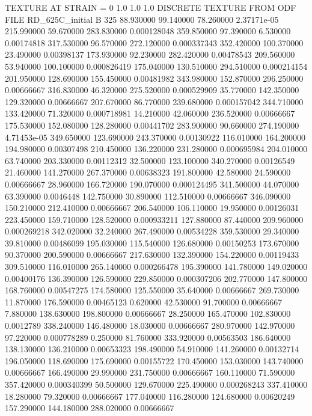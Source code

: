 TEXTURE AT STRAIN = 0
1.0   1.0   1.0
DISCRETE TEXTURE FROM ODF FILE RD_625C_initial
B 325
88.930000	99.140000	78.260000	2.37171e-05
215.990000	59.670000	283.830000	0.000128048
359.850000	97.390000	6.530000	0.00174818
317.530000	96.570000	272.120000	0.000337343
352.420000	100.370000	23.490000	0.00398137
173.930000	92.230000	282.420000	0.00478543
209.560000	53.940000	100.100000	0.000826419
175.040000	130.510000	294.510000	0.000214154
201.950000	128.690000	155.450000	0.00481982
343.980000	152.870000	296.250000	0.00666667
316.830000	46.320000	275.520000	0.000529909
35.770000	142.350000	129.320000	0.00666667
207.670000	86.770000	239.680000	0.000157042
344.710000	133.420000	71.320000	0.000718981
14.210000	42.060000	236.520000	0.00666667
175.530000	152.080000	128.280000	0.00441702
283.900000	90.660000	274.190000	4.71453e-05
349.650000	123.690000	243.370000	0.00130922
116.010000	164.200000	194.980000	0.00307498
210.450000	136.220000	231.280000	0.000695984
204.010000	63.740000	203.330000	0.00112312
32.500000	123.100000	340.270000	0.00126549
21.460000	141.270000	267.370000	0.00638323
191.800000	42.580000	24.590000	0.00666667
28.960000	166.720000	190.070000	0.000124495
341.500000	44.070000	63.390000	0.0046448
142.750000	30.890000	112.510000	0.00666667
346.090000	150.210000	212.410000	0.00666667
206.540000	106.110000	19.950000	0.00126031
223.450000	159.710000	128.520000	0.000933211
127.880000	87.440000	209.960000	0.000269218
342.020000	32.240000	267.490000	0.00534228
359.530000	29.340000	39.810000	0.00486099
195.030000	115.540000	126.680000	0.00150253
173.670000	90.370000	200.590000	0.00666667
217.630000	132.390000	154.220000	0.00119433
309.510000	116.010000	265.140000	0.000266478
195.390000	141.780000	149.020000	0.00400176
136.390000	126.590000	229.850000	0.000307206
202.770000	147.800000	168.760000	0.00547275
174.580000	125.550000	35.640000	0.00666667
269.730000	11.870000	176.590000	0.00465123
0.620000	42.530000	91.700000	0.00666667
7.880000	138.630000	198.800000	0.00666667
28.250000	165.470000	102.830000	0.0012789
338.240000	146.480000	18.030000	0.00666667
280.970000	142.970000	97.220000	0.000778289
0.250000	81.760000	333.920000	0.00563503
186.640000	138.130000	136.210000	0.00653323
198.490000	54.910000	141.260000	0.00132714
196.050000	118.690000	175.690000	0.00155722
170.450000	153.030000	143.740000	0.00666667
166.490000	29.990000	231.750000	0.00666667
160.110000	71.590000	357.420000	0.000340399
50.500000	129.670000	225.490000	0.000268243
337.410000	18.280000	79.320000	0.00666667
177.040000	116.280000	124.680000	0.00620249
157.290000	144.180000	288.020000	0.00666667
